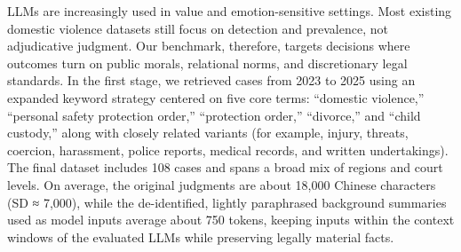 LLMs are increasingly used in value and emotion-sensitive settings. Most existing domestic violence datasets still focus on detection and prevalence, not adjudicative judgment. Our benchmark, therefore, targets decisions where outcomes turn on public morals, relational norms, and discretionary legal standards. In the first stage, we retrieved cases from 2023 to 2025 using an expanded keyword strategy centered on five core terms: ``domestic violence,'' ``personal safety protection order,'' ``protection order,'' ``divorce,'' and ``child custody,'' along with closely related variants (for example, injury, threats, coercion, harassment, police reports, medical records, and written undertakings). The final dataset includes 108 cases and spans a broad mix of regions and court levels. On average, the original judgments are about 18,000 Chinese characters (SD ≈ 7,000), while the de-identified, lightly paraphrased background summaries used as model inputs average about 750 tokens, keeping inputs within the context windows of the evaluated LLMs while preserving legally material facts.


